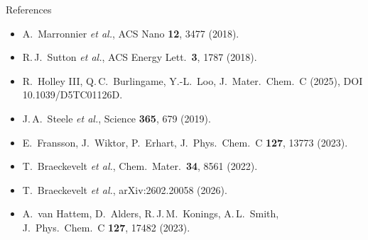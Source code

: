 \documentclass[aspectratio=169,10pt]{beamer}
\newcommand{\RA}{[1] A.~Marronnier \emph{et al.}, ACS Nano \textbf{12}, 3477 (2018).}
\newcommand{\RB}{[2] R.\,J.~Sutton \emph{et al.}, ACS Energy Lett.\ \textbf{3}, 1787 (2018).}
\newcommand{\RC}{[3] R.~Holley III, Q.\,C.~Burlingame, Y.-L.~Loo, J.\ Mater.\ Chem.\ C (2025), DOI 10.1039/D5TC01126D.}
\newcommand{\RD}{[4] J.\,A.~Steele \emph{et al.}, Science \textbf{365}, 679 (2019).}
\newcommand{\RE}{[5] E.~Fransson, J.~Wiktor, P.~Erhart, J.\ Phys.\ Chem.\ C \textbf{127}, 13773 (2023).}
\newcommand{\RF}{[6] T.~Braeckevelt \emph{et al.}, Chem.\ Mater.\ \textbf{34}, 8561 (2022).}
\newcommand{\RG}{[7] T.~Braeckevelt \emph{et al.}, arXiv:2602.20058 (2026).}
\newcommand{\RH}{[8] A.~van Hattem, D.~Alders, R.\,J.\,M.~Konings, A.\,L.~Smith, J.\ Phys.\ Chem.\ C \textbf{127}, 17482 (2023).}
\begin{document}
\begin{frame}{References}
  \tiny
  \begin{itemize}\setlength{\itemsep}{1pt}
    \item[] \RA
    \item[] \RB
    \item[] \RC
    \item[] \RD
    \item[] \RE
    \item[] \RF
    \item[] \RG
    \item[] \RH
  \end{itemize}
\end{frame}
\end{document}
